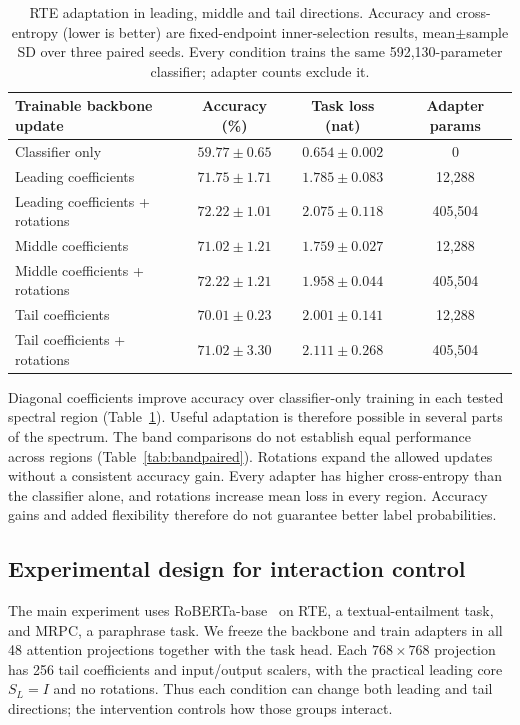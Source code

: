 \documentclass{article}
\begin{document}
\begin{table}[t]
\centering
\caption{RTE adaptation in leading, middle and tail directions. Accuracy and cross-entropy (lower is better) are fixed-endpoint inner-selection results, mean$\pm$sample SD over three paired seeds. Every condition trains the same 592,130-parameter classifier; adapter counts exclude it.}
\label{tab:tailcapacity}
\begin{tabular}{lccc}
\toprule
Trainable backbone update & Accuracy (\%) & Task loss (nat) & Adapter params\\
\midrule
Classifier only & $59.77 \pm 0.65$ & $0.654 \pm 0.002$ & 0 \\
Leading coefficients & $71.75 \pm 1.71$ & $1.785 \pm 0.083$ & 12,288 \\
Leading coefficients + rotations & $72.22 \pm 1.01$ & $2.075 \pm 0.118$ & 405,504 \\
Middle coefficients & $71.02 \pm 1.21$ & $1.759 \pm 0.027$ & 12,288 \\
Middle coefficients + rotations & $72.22 \pm 1.21$ & $1.958 \pm 0.044$ & 405,504 \\
Tail coefficients & $70.01 \pm 0.23$ & $2.001 \pm 0.141$ & 12,288 \\
Tail coefficients + rotations & $71.02 \pm 3.30$ & $2.111 \pm 0.268$ & 405,504 \\
\bottomrule
\end{tabular}
\end{table}


Diagonal coefficients improve accuracy over classifier-only training in each tested spectral region (Table~\ref{tab:tailcapacity}). Useful adaptation is therefore possible in several parts of the spectrum. The band comparisons do not establish equal performance across regions (Table~\ref{tab:bandpaired}). Rotations expand the allowed updates without a consistent accuracy gain. Every adapter has higher cross-entropy than the classifier alone, and rotations increase mean loss in every region. Accuracy gains and added flexibility therefore do not guarantee better label probabilities.

\subsection{Experimental design for interaction control}
\label{sec:matchedcontrol}
The main experiment uses RoBERTa-base~\citep{liu2019roberta} on RTE, a textual-entailment task, and MRPC, a paraphrase task. We freeze the backbone and train adapters in all 48 attention projections together with the task head. Each $768\times768$ projection has 256 tail coefficients and input/output scalers, with the practical leading core $S_L=I$ and no rotations. Thus each condition can change both leading and tail directions; the intervention controls how those groups interact.
\end{document}
